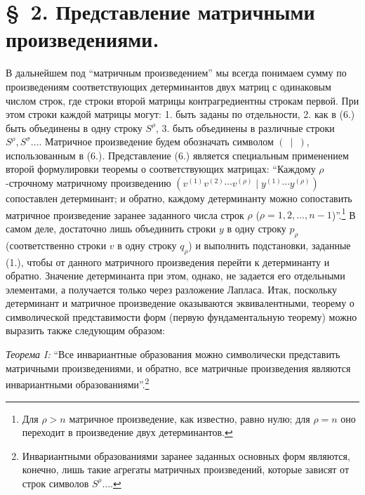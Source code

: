 \documentclass[11pt]{article}
\begin{document}
\section*{\S\ 2. Представление матричными произведениями.}

В дальнейшем под ``матричным произведением'' мы всегда понимаем сумму по произведениям соответствующих детерминантов двух матриц с одинаковым числом строк, где строки второй матрицы контрагредиентны строкам первой. При этом строки каждой матрицы могут: 1. быть заданы по отдельности, 2. как в (6.) быть объединены в одну строку $S^\rho$, 3. быть объединены в различные строки $S^\rho,S^\sigma\ldots$. Матричное произведение будем обозначать символом $(\ \mid\ )$, использованным в (6.). Представление (6.) является специальным применением второй формулировки теоремы о соответствующих матрицах: ``Каждому $\rho$-строчному матричному произведению $(v^{(1)}v^{(2)}\cdots v^{(\rho)}\mid y^{(1)}\cdots y^{(\rho)})$ сопоставлен детерминант; и обратно, каждому детерминанту можно сопоставить матричное произведение заранее заданного числа строк $\rho$ ($\rho=1,2,\ldots,n-1$)''.\footnote{Для $\rho>n$ матричное произведение, как известно, равно нулю; для $\rho=n$ оно переходит в произведение двух детерминантов.} В самом деле, достаточно лишь объединить строки $y$ в одну строку $p_\rho$ (соответственно строки $v$ в одну строку $q_\rho$) и выполнить подстановки, заданные (1.), чтобы от данного матричного произведения перейти к детерминанту и обратно. Значение детерминанта при этом, однако, не задается его отдельными элементами, а получается только через разложение Лапласа. Итак, поскольку детерминант и матричное произведение оказываются эквивалентными, теорему о символической представимости форм (первую фундаментальную теорему) можно выразить также следующим образом:

\emph{Теорема I:} ``Все инвариантные образования можно символически представить матричными произведениями, и обратно, все матричные произведения являются инвариантными образованиями''.\footnote{Инвариантными образованиями заранее заданных основных форм являются, конечно, лишь такие агрегаты матричных произведений, которые зависят от строк символов $S^\rho\ldots$.}
\end{document}
